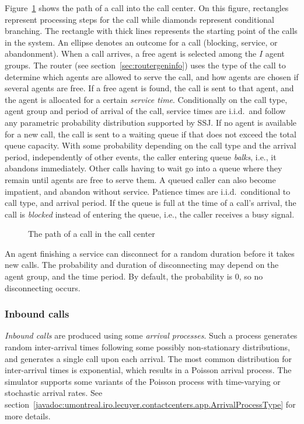 Figure~\ref{fig:callpath} shows the path of a call into
the call center.
On this figure, rectangles represent processing steps for
the call while diamonds represent conditional branching.
The rectangle with thick lines represents the starting point of the
calls in the system.
An ellipse denotes an outcome for a call (blocking, service,
or abandonment).
When a call arrives, a free agent is selected among the $I$ agent groups.
The router (see section~\ref{sec:routergeninfo}) uses
the type of the call to determine
which agents are allowed to serve the call,
and how agents are chosen if several agents are free.
If a free agent is found, the call is sent to that agent, and
the agent is allocated for a certain \emph{service time}.
Conditionally on the call type, agent group and period of arrival of
the call, service times are i.i.d.\ and follow any parametric
probability distribution supported by SSJ.
If no agent is available for a new call, the call is sent to a waiting
queue if that does not exceed the total queue capacity.
With some probability depending on the call type
and the arrival period, independently of other events, the caller
entering queue
\emph{balks}, i.e., it abandons
immediately.  Other calls
having to wait go into a queue where they remain
until agents are free to serve them.
A queued caller can also become impatient, and abandon without
service.
Patience times are i.i.d.\ conditional to call type, and arrival period.
If the queue is full at the time of a call's arrival,
the call is \emph{blocked} instead of entering the queue, i.e., the
caller
receives a busy signal.

\begin{figure}
\centering

\caption{The path of a call in the call center}
\label{fig:callpath}
\end{figure}

An agent finishing a service can disconnect for a random duration
before it takes new calls.
The probability and duration
of disconnecting may depend on the agent group, and
the time period.
By default, the probability is 0, so no disconnecting occurs.

\subsubsection{Inbound calls}

\emph{Inbound calls} are produced using
some \emph{arrival processes}.  Such a process generates
random inter-arrival times following some possibly
non-stationary distributions, and generates a single call upon each
arrival.  The most common distribution for inter-arrival times is
exponential, which results in a Poisson arrival process.
The simulator supports some variants of the Poisson process with
time-varying or stochastic arrival rates.
See
section~\ref{javadoc:umontreal.iro.lecuyer.contactcenters.app.ArrivalProcessType}
for more details.


